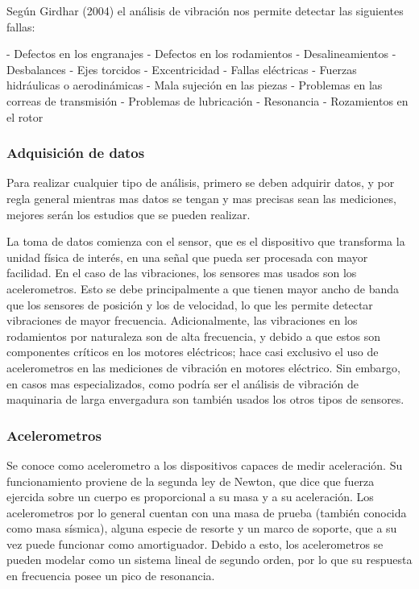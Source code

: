 Según Girdhar (2004) el análisis de vibración nos permite detectar las
siguientes fallas:

- Defectos en los engranajes
- Defectos en los rodamientos
- Desalineamientos
- Desbalances
- Ejes torcidos
- Excentricidad
- Fallas eléctricas
- Fuerzas hidráulicas o aerodinámicas
- Mala sujeción en las piezas
- Problemas en las correas de transmisión
- Problemas de lubricación
- Resonancia
- Rozamientos en el rotor





\subsubsection*{Adquisición de datos}

Para realizar cualquier tipo de análisis, primero se deben adquirir datos, y
por regla general mientras mas datos se tengan y mas precisas sean las
mediciones, mejores serán los estudios que se pueden realizar.

La toma de datos comienza con el sensor, que es el dispositivo que transforma
la unidad física de interés, en una señal que pueda ser procesada con mayor
facilidad. En el caso de las vibraciones, los sensores mas usados son los
acelerometros.  Esto se debe principalmente a que tienen mayor ancho de banda
que los sensores de posición y los de velocidad, lo que les permite detectar
vibraciones de mayor frecuencia. Adicionalmente, las vibraciones en los
rodamientos por naturaleza son de alta frecuencia, y debido a que estos son
componentes críticos en los motores eléctricos; hace casi exclusivo el uso de
acelerometros en las mediciones de vibración en motores eléctrico. Sin
embargo, en casos mas especializados, como podría ser el análisis de vibración
de maquinaria de larga envergadura son también usados los otros tipos de
sensores.

\subsubsection{Acelerometros}

Se conoce como acelerometro a los dispositivos capaces de medir aceleración. Su
funcionamiento proviene de la segunda ley de Newton, que dice que fuerza
ejercida sobre un cuerpo es proporcional a su masa y a su aceleración. Los
acelerometros por lo general cuentan con una masa de prueba (también conocida
como masa sísmica), alguna especie de resorte y un marco de soporte, que a su
vez puede funcionar como amortiguador. Debido a esto, los acelerometros se
pueden modelar como un sistema lineal de segundo orden, por lo que su respuesta
en frecuencia posee un pico de resonancia.




